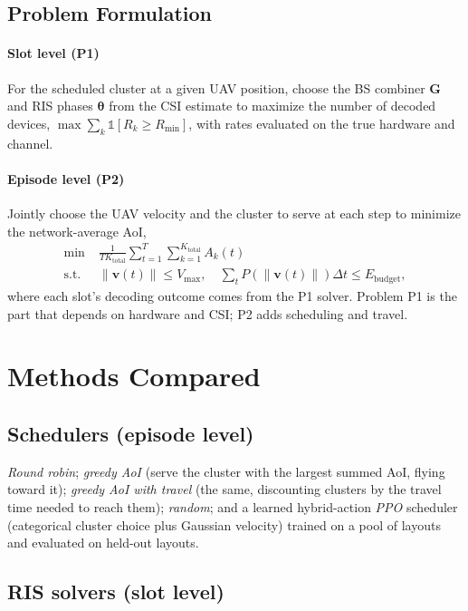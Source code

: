 \documentclass[journal]{IEEEtran}
\begin{document}
\subsection{Problem Formulation}
\paragraph*{Slot level (P1)} For the scheduled cluster at a given UAV position, choose the BS combiner $\mathbf{G}$ and RIS phases $\boldsymbol{\theta}$ from the CSI estimate to maximize the number of decoded devices, $\max \sum_{k}\mathbb{1}[R_k\ge R_{\text{min}}]$, with rates evaluated on the true hardware and channel.

\paragraph*{Episode level (P2)} Jointly choose the UAV velocity and the cluster to serve at each step to minimize the network-average AoI,
\begin{equation}
    \begin{split}
    \min \; & \frac{1}{T K_{\text{total}}} \sum_{t=1}^{T} \sum_{k=1}^{K_{\text{total}}} A_k(t) \\
    \text{s.t.}\; & \|\mathbf{v}(t)\|\le V_{\text{max}}, \quad \sum_t P(\|\mathbf{v}(t)\|)\Delta t \le E_{\text{budget}},
    \end{split}
\end{equation}
where each slot's decoding outcome comes from the P1 solver. Problem P1 is the part that depends on hardware and CSI; P2 adds scheduling and travel.

\section{Methods Compared}
\label{sec:methods}

\subsection{Schedulers (episode level)}
\emph{Round robin}; \emph{greedy AoI} (serve the cluster with the largest summed AoI, flying toward it); \emph{greedy AoI with travel} (the same, discounting clusters by the travel time needed to reach them); \emph{random}; and a learned hybrid-action \emph{PPO} scheduler (categorical cluster choice plus Gaussian velocity) trained on a pool of layouts and evaluated on held-out layouts.

\subsection{RIS solvers (slot level)}
\end{document}
